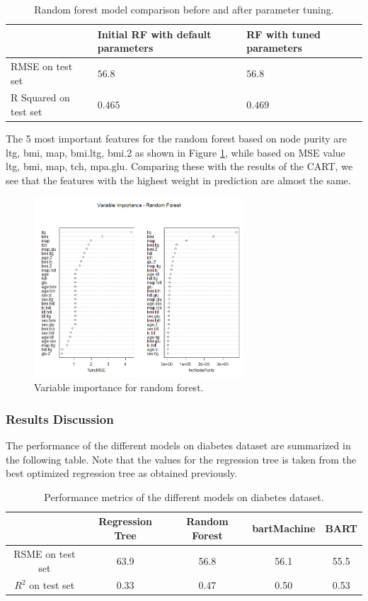 \documentclass{usiinftr}
\begin{document}
\begin{table}
\centering \label{RFtuned} \caption{Random forest model comparison before and after parameter tuning.}
\begin{tabular}{|l|l|l|}
\hline & Initial RF with default parameters & RF with tuned parameters \\
\hline RMSE on test set & $56.8$ & $56.8$ \\
\hline R Squared on test set & $0.465$ & $0.469$ \\
\hline
\end{tabular}
\end{table}

The 5 most important features for the random forest based on node purity are ltg, bmi, map, bmi.ltg, bmi.2 as shown in Figure \ref{RFImp}, while based on MSE value ltg, bmi, map, tch, mpa.glu. Comparing these with the results of the CART, we see that the features with the highest weight in prediction are almost the same. 

\begin{figure}[h!] 
\centering
\includegraphics[width=0.7\textwidth]{images/image115.png}
\caption{Variable importance for random forest.}
\label{RFImp}
\end{figure}

\subsubsection{Results Discussion}
The performance of the different models on diabetes dataset are summarized in the following table. Note that the values for the regression tree is taken from the best optimized regression tree as obtained previously. 

\begin{table} \label{result}
\centering \caption{Performance metrics of the different models on diabetes dataset.}
\begin{tabular}{|c|c|c|c|c|} 
\hline &  Regression Tree & Random Forest & bartMachine & BART \\
\hline RSME on test set & 63.9 & 56.8 & 56.1  & 55.5 \\
\hline $R^2$ on test set & 0.33 & 0.47 & 0.50  & 0.53\\
\hline
\end{tabular}
\end{table}
\end{document}
